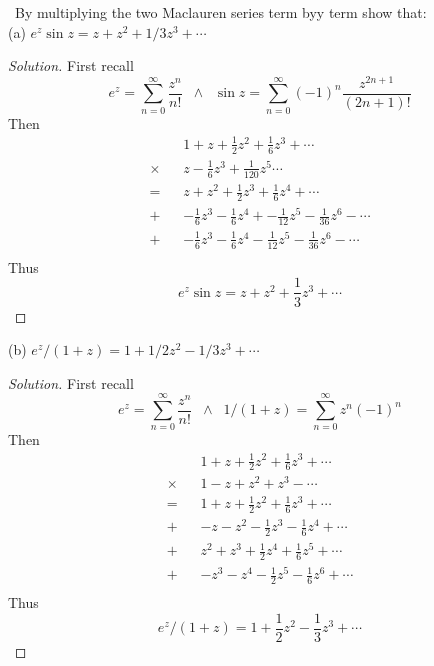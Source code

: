 \documentclass[11pt]{amsart}
\theoremstyle{definition}
\numberwithin{theorem}{section}
\numberwithin{definition}{section}
\numberwithin{equation}{section}
\newenvironment{solution}
  {\begin{proof}[Solution]}
  {\end{proof}}
\begin{document}
\medskip {}\ By multiplying the two Maclauren series term byy term show that:\\
(a) $e^z \sin z = z + z^2 + 1/3 z^3 + \cdots$
\begin{solution}
	First recall 
	\begin{equation*}
		e^z = \sum_{n=0}^\infty \frac{z^n}{n!}\;\;\wedge\;\;\sin z = \sum_{n=0}^\infty (-1)^n \frac{z^{2n+1}}{(2n+1)!}
	\end{equation*}
	Then
	\begin{equation*}
	\begin{aligned}
		&1 + z + \frac{1}{2}z^2 + \frac{1}{6}z^3 + \cdots\\
		\times\;\;\; &z - \frac{1}{6}z^3 + \frac{1}{120}z^5\cdots \\
		=\;\;\;& z + z^2 + \frac{1}{2}z^3 + \frac{1}{6}z^4 + \cdots\\
		+\;\;\;& - \frac{1}{6}z^3  -\frac{1}{6}z^4 + -  \frac{1}{12}z^5 -  \frac{1}{36}z^6 - \cdots\\
		+\;\;\;& - \frac{1}{6}z^3  -\frac{1}{6}z^4  -  \frac{1}{12}z^5 -  \frac{1}{36}z^6 - \cdots\\
	\end{aligned}
	\end{equation*}
	Thus
	\begin{equation*}
		e^z \sin z = z +z^2 + \frac{1}{3}z^3 + \cdots 
	\end{equation*}
\end{solution}
(b) $e^z/(1+z) = 1 + 1/2z^2 - 1/3z^3 + \cdots$
\begin{solution}
First recall 
	\begin{equation*}
		e^z = \sum_{n=0}^\infty \frac{z^n}{n!}\;\;\wedge\;\;1/(1+z) = \sum_{n=0}^\infty z^{n}(-1)^n 
	\end{equation*}
	Then
	\begin{equation*}
	\begin{aligned}
		&1 + z + \frac{1}{2}z^2 + \frac{1}{6}z^3 + \cdots\\
		\times\;\;\; &1 -z + z^2 + z^3 - \cdots \\
		=\;\;\;& 1 + z + \frac{1}{2}z^2 + \frac{1}{6}z^3 + \cdots\\
		+\;\;\;& -z - z^2 - \frac{1}{2}z^3 - \frac{1}{6}z^4 + \cdots\\
		+\;\;\;& z^2 + z^3 + \frac{1}{2}z^4 + \frac{1}{6}z^5 + \cdots\\
		+\;\;\;& -z^3 - z^4 - \frac{1}{2}z^5 - \frac{1}{6}z^6 + \cdots\\
	\end{aligned}
	\end{equation*}
	Thus
	\begin{equation*}
		e^z/(1+z) = 1 + \frac{1}{2}z^2 - \frac{1}{3}z^3 + \cdots
	\end{equation*}
\end{solution}
\end{document}
